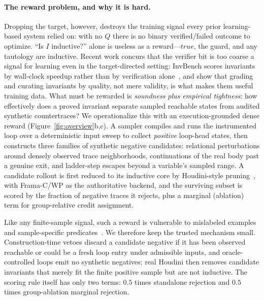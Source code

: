 \paragraph{The reward problem, and why it is hard.}
Dropping the target, however, destroys the training signal every prior learning-based system relied on: with no $Q$ there is no binary verified/failed outcome to optimize.
``Is $I$ inductive?'' alone is useless as a reward---$\mathit{true}$, the guard, and any tautology are inductive.
Recent work concurs that the verifier bit is too coarse a signal for learning even in the target-directed setting: InvBench scores invariants by wall-clock speedup rather than by verification alone~\citep{wei2025invbench}, and \citet{pinto2026notall} show that grading and curating invariants by quality, not mere validity, is what makes them useful training data.
What must be rewarded is \emph{soundness plus empirical tightness}: how effectively does a proved invariant separate sampled reachable states from audited synthetic countertraces?
We operationalize this with an execution-grounded dense reward (Figure~\ref{fig:overview}b,c).
A sampler compiles and runs the instrumented loop over a deterministic input sweep to collect \emph{positive} loop-head states, then constructs three families of synthetic negative candidates: relational perturbations around densely observed trace neighborhoods, continuations of the real body past a genuine exit, and ladder-step escapes beyond a variable's sampled range.
A candidate rollout is first reduced to its inductive core by Houdini-style pruning~\citep{flanagan2001houdini}, with Frama-C/WP as the authoritative backend, and the surviving subset is scored by the fraction of negative traces it rejects, plus a marginal (ablation) term for group-relative credit assignment.

Like any finite-sample signal, such a reward is vulnerable to mislabeled examples and sample-specific predicates~\citep{amodei2016concrete,skalse2022defining,gao2023scaling}.
We therefore keep the trusted mechanism small.  Construction-time vetoes discard a candidate negative if it has been observed reachable or could be a fresh loop entry under admissible inputs, and oracle-controlled loops emit no synthetic negatives; real Houdini then removes candidate invariants that merely fit the finite positive sample but are not inductive.  The scoring rule itself has only two terms: $0.5$ times standalone rejection and $0.5$ times group-ablation marginal rejection.

